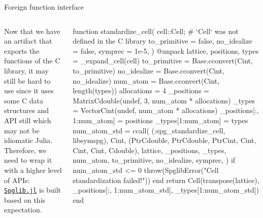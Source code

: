 \begin{frame}[fragile]{Foreign function interface}

    \begin{columns}
        \begin{column}{0.3\textwidth}
            Now that we have an artifact that exports the functions of the C library,
            it may still be hard to use since it uses some C data structures and API still which may
            not be idiomatic Julia. Therefore, we need to wrap it with a higher level of APIs:
            \href{https://github.com/singularitti/Spglib.jl}{\texttt{Spglib.jl}} is built based on
            this expectation.
        \end{column}

        \begin{column}{0.7\textwidth}
            {\tiny
                \begin{algorithmblock}
                    \begin{juliaverbatim}
function standardize_cell(
    cell::Cell;  # `Cell` was not defined in the C library
    to_primitive = false,
    no_idealize = false,
    symprec = 1e-5,
)
    @unpack lattice, positions, types = _expand_cell(cell)
    to_primitive = Base.cconvert(Cint, to_primitive)
    no_idealize = Base.cconvert(Cint, no_idealize)
    num_atom = Base.cconvert(Cint, length(types))
    allocations = 4
    _positions = Matrix{Cdouble}(undef, 3, num_atom * allocations)
    _types = Vector{Cint}(undef, num_atom * allocations)
    _positions[:, 1:num_atom] = positions
    _types[1:num_atom] = types
    num_atom_std = ccall(
        (:spg_standardize_cell, libsymspg),
        Cint,
        (Ptr{Cdouble}, Ptr{Cdouble}, Ptr{Cint}, Cint, Cint, Cint, Cdouble),
        lattice,
        _positions,
        _types,
        num_atom,
        to_primitive,
        no_idealize,
        symprec,
    )
    if num_atom_std <= 0
        throw(SpglibError("Cell standardization failed!"))
    end
    return Cell(transpose(lattice), _positions[:, 1:num_atom_std], _types[1:num_atom_std])
end
                    \end{juliaverbatim}
                \end{algorithmblock}
            }
        \end{column}
    \end{columns}

\end{frame}

